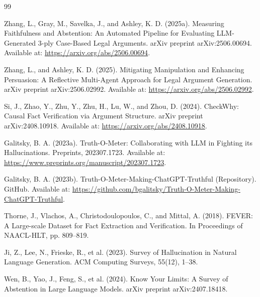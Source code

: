\documentclass[12pt,a4paper,oneside]{report}
\begin{document}
\begin{thebibliography}{99}

Zhang, L., Gray, M., Savelka, J., and Ashley, K. D. (2025a).
Measuring Faithfulness and Abstention: An Automated Pipeline for Evaluating LLM-Generated 3-ply Case-Based Legal Arguments.
arXiv preprint arXiv:2506.00694.
Available at: \url{https://arxiv.org/abs/2506.00694}.

Zhang, L., and Ashley, K. D. (2025).
Mitigating Manipulation and Enhancing Persuasion: A Reflective Multi-Agent Approach for Legal Argument Generation.
arXiv preprint arXiv:2506.02992.
Available at: \url{https://arxiv.org/abs/2506.02992}.

Si, J., Zhao, Y., Zhu, Y., Zhu, H., Lu, W., and Zhou, D. (2024).
CheckWhy: Causal Fact Verification via Argument Structure.
arXiv preprint arXiv:2408.10918.
Available at: \url{https://arxiv.org/abs/2408.10918}.

Galitsky, B. A. (2023a).
Truth-O-Meter: Collaborating with LLM in Fighting its Hallucinations.
Preprints, 202307.1723.
Available at: \url{https://www.preprints.org/manuscript/202307.1723}.

Galitsky, B. A. (2023b).
Truth-O-Meter-Making-ChatGPT-Truthful (Repository).
GitHub.
Available at: \url{https://github.com/bgalitsky/Truth-O-Meter-Making-ChatGPT-Truthful}.

Thorne, J., Vlachos, A., Christodoulopoulos, C., and Mittal, A. (2018).
FEVER: A Large-scale Dataset for Fact Extraction and Verification.
In Proceedings of NAACL-HLT, pp. 809--819.

Ji, Z., Lee, N., Frieske, R., et al. (2023).
Survey of Hallucination in Natural Language Generation.
ACM Computing Surveys, 55(12), 1--38.

Wen, B., Yao, J., Feng, S., et al. (2024).
Know Your Limits: A Survey of Abstention in Large Language Models.
arXiv preprint arXiv:2407.18418.

\end{thebibliography}
\end{document}

